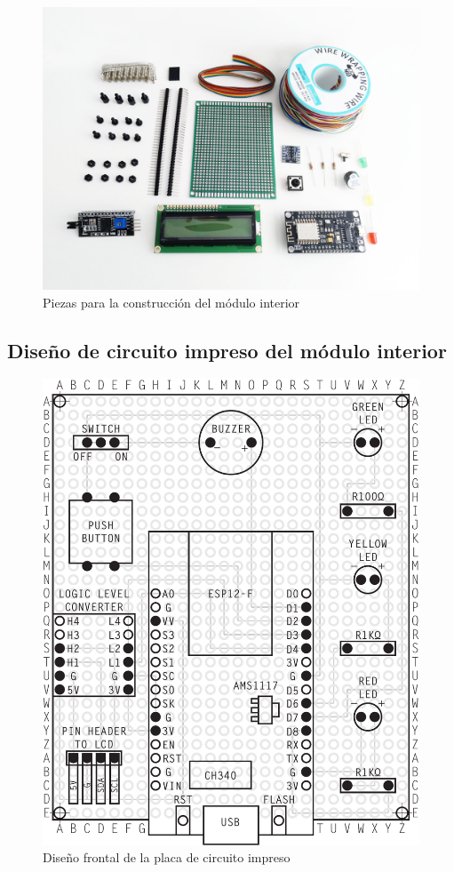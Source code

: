 \begin{figure}
  \centering
  \includegraphics[width=0.98\columnwidth]{../photos/interior-pieces}
  \caption{Piezas para la construcción del módulo interior}
  \label{fig:interior-pieces}
\end{figure}

\clearpage

\subsection{Diseño de circuito impreso del módulo interior}

\vfill

\begin{figure}[H]
  \centering
  \includegraphics[width=0.7\columnwidth]{../design/interior-board-front}
  \caption{Diseño frontal de la placa de circuito impreso}
  \label{fig:interior-board-front}
\end{figure}

